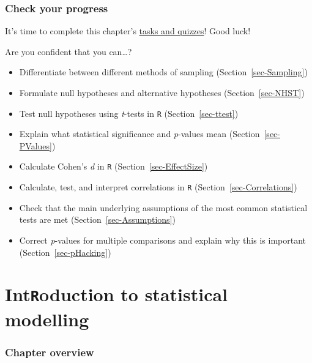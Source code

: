 \documentclass[
  letterpaper,
  DIV=11,
  numbers=noendperiod]{scrreprt}
\providecommand{\tightlist}{%
  \setlength{\itemsep}{0pt}\setlength{\parskip}{0pt}}
\begin{document}
\subsection*{Check your progress}\label{check-your-progress-21}

It's time to complete this chapter's
\href{https://elenlefoll.github.io/RstatsTextbook/quizzes/11_quiz.html}{tasks
and quizzes}! Good luck! 

Are you confident that you can\ldots?

\begin{itemize}
\tightlist
\item[$\square$]
  Differentiate between different methods of sampling
  (Section~\ref{sec-Sampling})
\item[$\square$]
  Formulate null hypotheses and alternative hypotheses
  (Section~\ref{sec-NHST})
\item[$\square$]
  Test null hypotheses using \emph{t}-tests in \texttt{R}
  (Section~\ref{sec-ttest})
\item[$\square$]
  Explain what statistical significance and \emph{p}-values mean
  (Section~\ref{sec-PValues})
\item[$\square$]
  Calculate Cohen's \emph{d} in \texttt{R}
  (Section~\ref{sec-EffectSize})
\item[$\square$]
  Calculate, test, and interpret correlations in \texttt{R}
  (Section~\ref{sec-Correlations})
\item[$\square$]
  Check that the main underlying assumptions of the most common
  statistical tests are met (Section~\ref{sec-Assumptions})
\item[$\square$]
  Correct \emph{p}-values for multiple comparisons and explain why this
  is important (Section~\ref{sec-pHacking})
\end{itemize}


\chapter{\texorpdfstring{Int\texttt{R}oduction to statistical
modelling}{IntRoduction to statistical modelling}}\label{sec-SLR}

\subsection*{Chapter overview}\label{chapter-overview-11}
\end{document}
